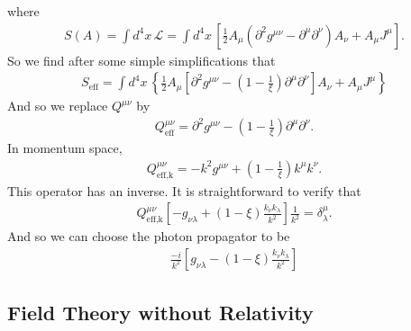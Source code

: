\documentclass{book}
\theoremstyle{definition}
\newcommand{\p}{\partial}
\newcommand{\lag}{\mathcal{L}}
\newcommand{\f}[2]{\frac{#1}{#2}}
\newcommand{\lp}{\left(}
\newcommand{\rp}{\right)}
\newcommand{\lb}{\left[}
\newcommand{\rb}{\right]}
\newcommand{\lc}{\left\{}
\newcommand{\rc}{\right\}}
\begin{document}
where 
\begin{align}
S(A) = \int d^4x\,\lag = \int d^4x\, \lb \f{1}{2}A_\mu (\p^2 g^{\mu\nu} - \p^\mu \p^\nu)A_\nu + A_\mu J^\mu \rb.
\end{align}
So we find after some simple simplifications that
\begin{align}
\boxed{S_\text{eff} = \int d^4x\, \lc \f{1}{2}A_\mu \lb \p^2 g^{\mu\nu} - \lp 1-\f{1}{\xi} \rp\p^\mu \p^\nu \rb A_\nu + A_\mu J^\mu \rc}
\end{align}
And so we replace $Q^{\mu\nu}$ by
\begin{align}
Q^{\mu\nu}_\text{eff} = \p^2 g^{\mu\nu} - \lp1 - \f{1}{\xi} \rp\p^\mu \p^\nu.
\end{align}
In momentum space, 
\begin{align}
Q^{\mu\nu}_\text{eff,k} = -k^2 g^{\mu\nu} + \lp 1 - \f{1}{\xi} \rp k^\mu k^\nu.
\end{align}
This operator has an inverse. It is straightforward to verify that
\begin{align}
Q^{\mu\nu}_\text{eff,k}\lb -g_{\nu\lambda} + (1-\xi)\f{k_\nu k_\lambda}{k^2} \rb\f{1}{k^2} = \delta^\mu_\lambda.
\end{align}
And so we can choose the photon propagator to be
\begin{align}
\boxed{\f{-i}{k^2}\lb g_{\nu\lambda} - (1-\xi)\f{k_\nu k_\lambda}{k^2} \rb}
\end{align}
















































\newpage


\subsection{Field Theory without Relativity}
\end{document}
